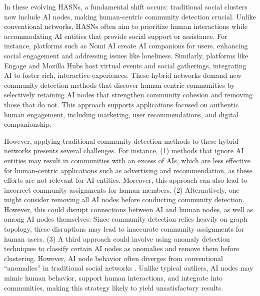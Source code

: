 In these evolving HASNs, a fundamental shift occurs: traditional social clusters now include AI nodes, making human-centric community detection crucial. Unlike conventional networks, HASNs often aim to prioritize human interactions while accommodating AI entities that provide social support or assistance. For instance, platforms such as Nomi AI \cite{nomiAI2024} create AI companions for users, enhancing social engagement and addressing issues like loneliness. Similarly, platforms like Engage \cite{engage2023} and Mozilla Hubs \cite{hubs2023mozilla} host virtual events and social gatherings, integrating AI to foster rich, interactive experiences. These hybrid networks demand new community detection methods that discover human-centric communities by selectively retaining AI nodes that strengthen community cohesion and removing those that do not. This approach supports applications focused on authentic human engagement, including marketing, user recommendations, and digital companionship.

However, applying traditional community detection methods to these hybrid networks presents several challenges. For instance, (1) methods that ignore AI entities may result in communities with an excess of AIs, which are less effective for human-centric applications such as advertising and recommendation, as these efforts are not relevant for AI entities. Moreover, this approach can also lead to incorrect community assignments for human members. (2) Alternatively, one might consider removing all AI nodes before conducting community detection. However, this could disrupt connections between AI and human nodes, as well as among AI nodes themselves. Since community detection relies heavily on graph topology, these disruptions may lead to inaccurate community assignments for human users. (3) A third approach could involve using anomaly detection techniques to classify certain AI nodes as anomalies and remove them before clustering. However, AI node behavior often diverges from conventional “anomalies” in traditional social networks \cite{ma2021comprehensive}\cite{lamichhane2024anomaly}. Unlike typical outliers, AI nodes may mimic human behavior, support human interactions, and integrate into communities, making this strategy likely to yield unsatisfactory results.


